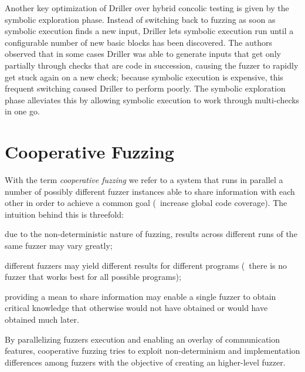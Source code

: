 Another key optimization of Driller over hybrid concolic testing is given by the
symbolic exploration phase. Instead of switching back to fuzzing as soon as
symbolic execution finds a new input, Driller lets symbolic execution run until
a configurable number of new basic blocks has been discovered. The authors
observed that in some cases Driller was able to generate inputs that get only
partially through checks that are code in succession, causing the fuzzer to
rapidly get stuck again on a new check; because symbolic execution is expensive,
this frequent switching caused Driller to perform poorly. The symbolic
exploration phase alleviates this by allowing symbolic execution to work through
multi-checks in one go.

\section{Cooperative Fuzzing}
With the term \emph{cooperative fuzzing} we refer to a system that runs in
parallel a number of possibly different fuzzer instances able to share
information with each other in order to achieve a common goal (\ie~increase
global code coverage). The intuition behind this is threefold:
\begin{enumeratein}
    \item due to the non-deterministic nature of fuzzing, results across
        different runs of the same fuzzer may vary greatly;
    \item different fuzzers may yield different results for different programs
        (\ie~there is no fuzzer that works best for all possible programs);
    \item providing a mean to share information may enable a single fuzzer to
        obtain critical knowledge that otherwise would not have obtained or
        would have obtained much later.
\end{enumeratein}
By parallelizing fuzzers execution and enabling an overlay of communication
features, cooperative fuzzing tries to exploit non-determinism and
implementation differences among fuzzers with the objective of creating an
higher-level fuzzer.

